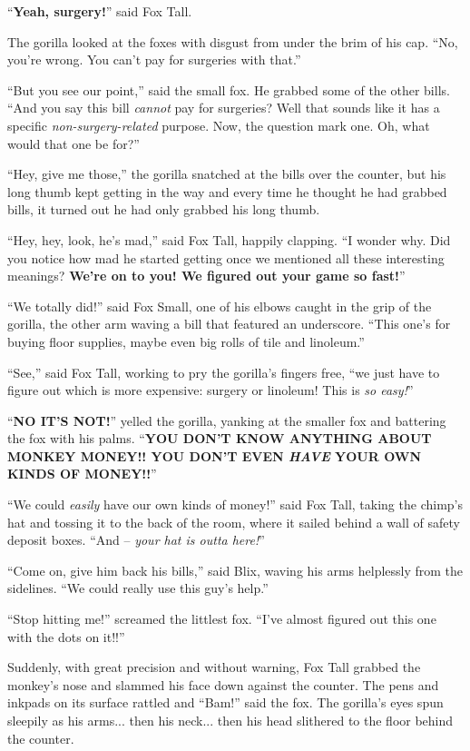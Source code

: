 \documentclass[10pt,twoside]{report}
\begin{document}
``{\bf Yeah, surgery!}'' said Fox Tall.

The gorilla looked at the foxes with disgust from under the brim of
his cap.  ``No, you're wrong.  You can't pay for surgeries with
that.''

``But you see our point,'' said the small fox.  He grabbed some of the
other bills. ``And you say this bill {\em cannot} pay for surgeries?
Well that sounds like it has a specific {\em non-surgery-related}
purpose.  Now, the question mark one.  Oh, what would that one be
for?''

``Hey, give me those,'' the gorilla snatched at the bills over the
counter, but his long thumb kept getting in the way and every time he
thought he had grabbed bills, it turned out he had only grabbed his
long thumb.

``Hey, hey, look, he's mad,'' said Fox Tall, happily clapping.  ``I
wonder why.  Did you notice how mad he started getting once we
mentioned all these interesting meanings?  {\bf We're on to you!  We
  figured out your game so fast!}''

``We totally did!'' said Fox Small, one of his elbows caught in the
grip of the gorilla, the other arm waving a bill that featured an
underscore. ``This one's for buying floor supplies, maybe even big
rolls of tile and linoleum.''

``See,'' said Fox Tall, working to pry the gorilla's fingers free,
``we just have to figure out which is more expensive: surgery or
linoleum!  This is {\em so easy!}''

``{\bf NO IT'S NOT!}'' yelled the gorilla, yanking at the smaller fox
and battering the fox with his palms.  ``{\bf YOU DON'T KNOW ANYTHING
  ABOUT MONKEY MONEY!!  YOU DON'T EVEN {\em HAVE} YOUR OWN KINDS OF
  MONEY!!}''

``We could {\em easily} have our own kinds of money!'' said Fox Tall,
taking the chimp's hat and tossing it to the back of the room, where
it sailed behind a wall of safety deposit boxes.  ``And -- {\em your
  hat is outta here!}''

``Come on, give him back his bills,'' said Blix, waving his arms
helplessly from the sidelines.  ``We could really use this guy's
help.''

``Stop hitting me!'' screamed the littlest fox.  ``I've almost figured
out this one with the dots on it!!''

Suddenly, with great precision and without warning, Fox Tall grabbed
the monkey's nose and slammed his face down against the counter.  The
pens and inkpads on its surface rattled and ``Bam!'' said the fox.
The gorilla's eyes spun sleepily as his arms... then his neck... then
his head slithered to the floor behind the counter.
\end{document}
